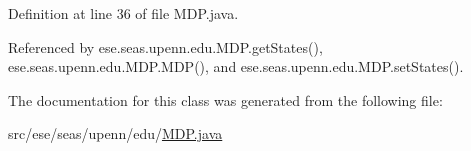 Definition at line 36 of file M\+D\+P.\+java.



Referenced by ese.\+seas.\+upenn.\+edu.\+M\+D\+P.\+get\+States(), ese.\+seas.\+upenn.\+edu.\+M\+D\+P.\+M\+D\+P(), and ese.\+seas.\+upenn.\+edu.\+M\+D\+P.\+set\+States().



The documentation for this class was generated from the following file\+:\begin{DoxyCompactItemize}
\item 
src/ese/seas/upenn/edu/\hyperlink{_m_d_p_8java}{M\+D\+P.\+java}\end{DoxyCompactItemize}
